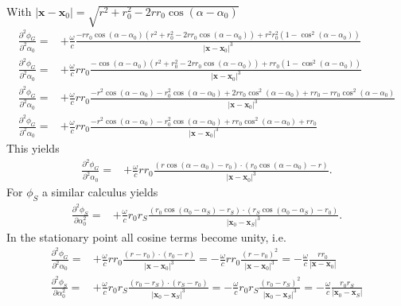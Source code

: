 \documentclass[a4paper,BCOR=15mm,10pt,twoside]{scrartcl}
\newcommand\wc{\frac{\omega}{c}}  %
\newcommand\azx{\alpha}  %
\renewcommand{\vec}[1]{\mathbf{#1}}  %
\begin{document}
%
With $|\vec{x} -\vec{x}_0| = \sqrt{r^2 + r_0^2 -2 r r_0 \cos(\azx-\azx_0)}$
%
\begin{align}
\frac{\partial^2 \phi_G}{\partial^2 \azx_0} =&+\wc \frac{
- r r_0 \cos(\azx-\azx_0) (r^2 + r_0^2 -2 r r_0 \cos(\azx-\azx_0)) + 
r^2 r_0^2 (1-\cos^2(\azx-\azx_0))
}
{|\vec{x} -\vec{x}_0|^3}\\
\frac{\partial^2 \phi_G}{\partial^2 \azx_0} =&+\wc r r_0 \frac{
- \cos(\azx-\azx_0) (r^2 + r_0^2 -2 r r_0 \cos(\azx-\azx_0)) + 
r r_0 (1-\cos^2(\azx-\azx_0))
}
{|\vec{x} -\vec{x}_0|^3}\\
\frac{\partial^2 \phi_G}{\partial^2 \azx_0} =&+\wc r r_0 \frac{
-r^2 \cos(\azx-\azx_0) - r_0^2 \cos(\azx-\azx_0) + 2 r r_0 \cos^2(\azx-\azx_0) + 
r r_0 - r r_0 \cos^2(\azx-\azx_0)
}
{|\vec{x} -\vec{x}_0|^3}\\
\frac{\partial^2 \phi_G}{\partial^2 \azx_0} =&+\wc r r_0 \frac{
-r^2 \cos(\azx-\azx_0) - r_0^2 \cos(\azx-\azx_0) + r r_0 \cos^2(\azx-\azx_0) + 
r r_0
}
{|\vec{x} -\vec{x}_0|^3}
\end{align}
This yields
\begin{align}
\frac{\partial^2 \phi_G}{\partial^2 \azx_0} =&+\wc r r_0 \frac{
(r \cos(\azx-\azx_0) - r_0) \cdot (r_0 \cos(\azx-\azx_0) - r)
}
{|\vec{x} -\vec{x}_0|^3}.
\end{align}
For $\phi_S$ a similar calculus yields
\begin{align}
\frac{\partial^2 \phi_S}{\partial \azx_0^2} =&+\wc r_0 r_S \frac{
(r_0 \cos(\azx_0-\azx_S) - r_S) \cdot (r_S \cos(\azx_0-\azx_S) - r_0)
}
{|\vec{x}_0 -\vec{x}_S|^3}.
\end{align}
In the stationary point all cosine terms become unity, i.e.
\begin{align}
\frac{\partial^2 \phi_G}{\partial^2 \azx_0} =&+\wc r r_0 \frac{
(r - r_0) \cdot (r_0 - r)
}
{|\vec{x} -\vec{x}_0|^3} = -\wc r r_0 \frac{
(r - r_0)^2 
}
{|\vec{x} -\vec{x}_0|^3}=
-\wc \frac{r r_0}{|\vec{x} -\vec{x}_0|}\\
%
\frac{\partial^2 \phi_S}{\partial \azx_0^2} =&+\wc r_0 r_S \frac{
(r_0 - r_S) \cdot (r_S - r_0)
}
{|\vec{x}_0 -\vec{x}_S|^3} = -\wc r_0 r_S \frac{
(r_0 - r_S)^2
}
{|\vec{x}_0 -\vec{x}_S|^3} = -\wc \frac{
r_0 r_S
}
{|\vec{x}_0 -\vec{x}_S|}
\end{align}
\end{document}

